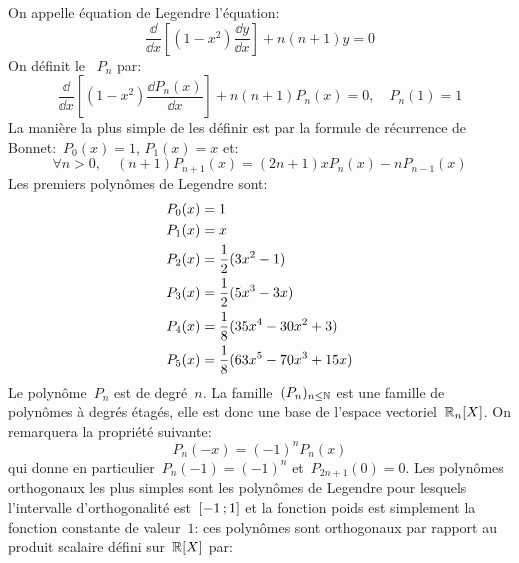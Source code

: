 On appelle équation de Legendre l'équation: 
\begin{equation}
\frac{\dd }{\dd x}[(1-x^{2})\frac{\dd y}{\dd x}]+n(n+1)y=0
\end{equation}
On définit le ~$P_n$ par: 
\begin{equation}
\frac{\dd}{\dd x}[(1-x^{2})\frac{\dd P_n(x)}{\dd x}]+n(n+1)P_n(x)=0,\quad P_n(1)=1
\end{equation}
La manière la plus simple de les définir est par la formule de récurrence de Bonnet:~$P_0(x)=1$, $P_1(x)=x$ et:
\begin{equation}
\forall n>0, \quad (n+1)P_{n+1}(x)=(2n+1)xP_n(x) - nP_{n-1}(x)
\end{equation}
Les premiers polynômes de Legendre sont:
\begin{equation}\colorgris
\begin{aligned}
&P_{0}(x)=1\\
&P_{1}(x)=x\\
&P_{2}(x)=\frac{1}{2}(3x^{2}-1)\\
&P_{3}(x)=\frac{1}{2}(5x^{3}-3x)\\
&P_{4}(x)=\frac{1}{8}(35x^{4}-30x^{2}+3)\\
&P_{5}(x)=\frac{1}{8}(63x^{5}-70x^{3}+15x)
\end{aligned}
\end{equation} 
Le polynôme~$P_n$ est de degré~$n$. La famille~$(P_n)_{n\leq \mathbb N}$ est une famille de polynômes à degrés étagés, elle est donc une base de l'espace vectoriel~$\mathbb R_n[X]$. On remarquera la propriété suivante: 
\begin{equation}
P_n(-x)=(-1)^nP_n(x)
\end{equation}
qui donne en particulier~$P_n( - 1) = ( - 1)^n$ et~$P_{2n + 1}(0) = 0$. Les polynômes orthogonaux les plus simples sont les polynômes de Legendre pour lesquels l'intervalle d'orthogonalité est~$\mathopen{[}-1\,;1\mathclose{]}$ et la fonction poids est simplement la fonction constante de valeur~$1$: ces polynômes sont orthogonaux par rapport au produit scalaire défini sur~$\mathbb R[X]$ par: 
